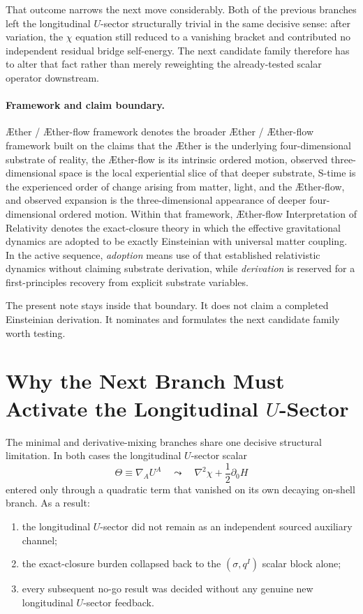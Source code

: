 \documentclass[11pt]{article}
\newcommand{\Aether}{\AE{}ther}
\newcommand{\Aflow}{\AE{}ther-flow}
\newcommand{\TheoryName}{\Aflow{} Interpretation of Relativity}
\newcommand{\TheoryProgram}{\Aether{} / \Aflow{} framework}
\begin{document}
That outcome narrows the next move considerably. Both of the previous branches left the longitudinal \(U\)-sector structurally trivial in the same decisive sense: after variation, the \(\chi\) equation still reduced to a vanishing bracket and contributed no independent residual bridge self-energy. The next candidate family therefore has to alter that fact rather than merely reweighting the already-tested scalar operator downstream.

\paragraph{Framework and claim boundary.}
\TheoryProgram{} denotes the broader \Aether{} / \Aflow{} framework built on the claims that the \Aether{} is the underlying four-dimensional substrate of reality, the \Aflow{} is its intrinsic ordered motion, observed three-dimensional space is the local experiential slice of that deeper substrate, S-time is the experienced order of change arising from matter, light, and the \Aflow{}, and observed expansion is the three-dimensional appearance of deeper four-dimensional ordered motion. Within that framework, \TheoryName{} denotes the exact-closure theory in which the effective gravitational dynamics are adopted to be exactly Einsteinian with universal matter coupling. In the active sequence, \emph{adoption} means use of that established relativistic dynamics without claiming substrate derivation, while \emph{derivation} is reserved for a first-principles recovery from explicit substrate variables.

The present note stays inside that boundary. It does not claim a completed Einsteinian derivation. It nominates and formulates the next candidate family worth testing.

\section{Why the Next Branch Must Activate the Longitudinal \texorpdfstring{\(U\)}{U}-Sector}

The minimal and derivative-mixing branches share one decisive structural limitation. In both cases the longitudinal \(U\)-sector scalar
\[
\Theta \equiv \nabla_AU^A
\quad\leadsto\quad
\nabla^2\chi+\frac{1}{2}\partial_0H
\]
entered only through a quadratic term that vanished on its own decaying on-shell branch. As a result:
\begin{enumerate}
    \item the longitudinal \(U\)-sector did not remain as an independent sourced auxiliary channel;
    \item the exact-closure burden collapsed back to the \((\sigma,q^I)\) scalar block alone;
    \item every subsequent no-go result was decided without any genuine new longitudinal \(U\)-sector feedback.
\end{enumerate}
\end{document}
